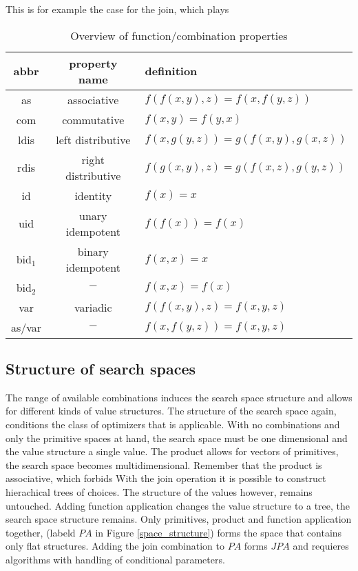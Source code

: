 \documentclass[english]{article}
\begin{document}
This is for example the case for the join, which plays


\begin{table}
\centering
\begin{tabular}{c | c | l}
abbr & property name & definition \\
\hline
as               & associative        & $f(f(x,y),z) = f(x,f(y,z))$ \\
com              & commutative        & $f(x,y)=f(y,x)$ \\
ldis             & left distributive  & $f(x,g(y,z))=g(f(x,y),g(x,z))$ \\
rdis             & right distributive & $f(g(x,y),z)=g(f(x,z),g(y,z))$ \\
id               & identity           & $f(x) = x$ \\
uid              & unary idempotent   & $f(f(x)) = f(x)$ \\
bid$_{\text{1}}$ & binary idempotent  & $f(x,x) = x$ \\
bid$_{\text{2}}$ & \multicolumn{1}{|c|}{$-$} & $f(x,x) = f(x)$ \\
var              & variadic           & $f(f(x,y),z) = f(x,y,z)$\\
as/var           & \multicolumn{1}{|c|}{$-$} & $f(x,f(y,z)) = f(x,y,z)$ \\
\end{tabular}
\caption{Overview of function/combination properties}
\label{funcprops}
\end{table}


\subsection{Structure of search spaces}
The range of available combinations induces the search space structure and allows for different kinds of value structures. The structure of the search space again, conditions the class of optimizers that is applicable.
With no combinations and only the primitive spaces at hand, the search space must be one dimensional and the value structure a single value.
The product allows for vectors of primitives, the search space becomes multidimensional. Remember that the product is associative, which forbids
With the join operation it is possible to construct hierachical trees of choices. The structure of the values however, remains untouched.
Adding function application changes the value structure to a tree, the search space structure remains.
Only primitives, product and function application together, (labeld $PA$ in Figure \ref{space_structure}) forms the space that contains only flat structures. Adding the join combination to $PA$ forms $JPA$ and requieres algorithms with handling of conditional parameters.
\end{document}
